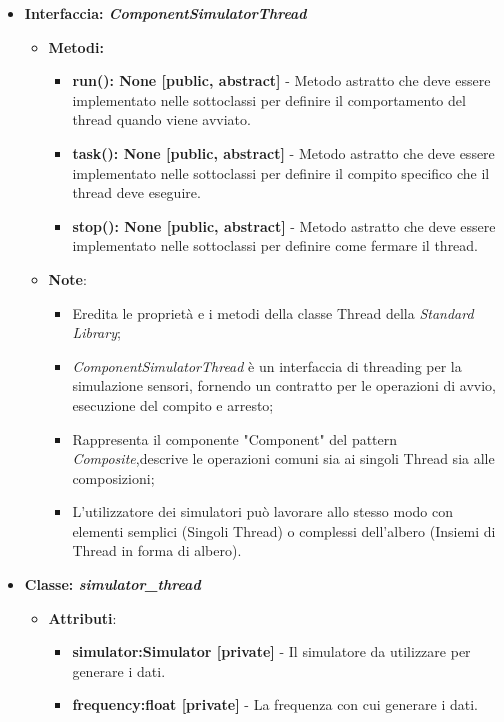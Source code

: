 \begin{itemize}
    \item{\textbf{Interfaccia: \textit{ComponentSimulatorThread}}}
    \begin{itemize}
        \item \textbf{Metodi: }
        \begin{itemize}
            \item \textbf{run(): None [public, abstract]} - Metodo astratto che deve essere implementato nelle sottoclassi per definire il comportamento del thread quando viene avviato.
            \item \textbf{task(): None [public, abstract]} - Metodo astratto che deve essere implementato nelle sottoclassi per definire il compito specifico che il thread deve eseguire.
            \item \textbf{stop(): None [public, abstract]} - Metodo astratto che deve essere implementato nelle sottoclassi per definire come fermare il thread.
        \end{itemize}
        \item\textbf{Note}:
        \begin{itemize}
            \item Eredita le proprietà e i metodi della classe Thread della \textit{Standard Library};
            \item \textit{ComponentSimulatorThread} è un interfaccia di threading per la simulazione sensori, fornendo un contratto per le operazioni di avvio, esecuzione del compito e arresto;
            \item Rappresenta il componente "Component" del pattern \textit{Composite},descrive le operazioni comuni sia ai singoli Thread sia alle composizioni;
            \item L'utilizzatore dei simulatori può lavorare allo stesso modo con elementi semplici (Singoli Thread) o complessi dell'albero (Insiemi di Thread in forma di albero).
        \end{itemize}
    \end{itemize}
    \item{\textbf{Classe: \textit{simulator\_thread}}}
    \begin{itemize}
        \item\textbf{Attributi}:
        \begin{itemize}
            \item \textbf{simulator:Simulator [private]} - Il simulatore da utilizzare per generare i dati.
            \item \textbf{frequency:float [private]} - La frequenza con cui generare i dati.

\end{itemize}
\end{itemize}
\end{itemize}

